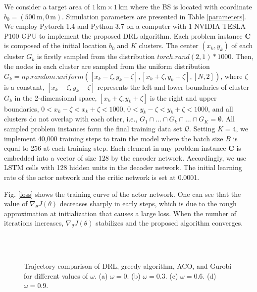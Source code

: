 \documentclass[journal]{IEEEtran}
\begin{document}
We consider a target area of $1\, \text{km} \times 1 \,\text{km}$ where the BS is located with coordinate $b_0 = (500\, \text{m}, 0 \,\text{m})$. Simulation parameters are presented in Table \ref{parameters}. We employ Pytorch 1.4 and Python 3.7 on a computer with 1 NVIDIA TESLA P100 GPU to implement the proposed DRL algorithm. {Each problem instance $\bm{C}$ is composed of the initial location $b_0$ and $K$ clusters. The center $(x_k, y_k)$ of each cluster $G_k$ is firstly sampled from the distribution $ torch.rand(2, 1) * 1000$. Then, the nodes in each cluster are sampled from the uniform distribution $G_k = np.random.uniform([x_k-\zeta, y_k-\zeta], [x_k+\zeta, y_k+\zeta], [N, 2])$, where $\zeta$ is a constant, $[x_k-\zeta, y_k-\zeta]$ represents the left and lower boundaries of cluster $G_k$ in the 2-dimensional space, $[x_k+\zeta, y_k+\zeta]$ is the right and upper boundaries, $0 < x_k-\zeta < x_k+\zeta < 1000$, $0 < y_k-\zeta < y_k+\zeta < 1000$, and all clusters do not overlap with each other, i.e., $G_1 \cap \dots \cap G_k \cap \dots \cap G_K = \emptyset$. All sampled problem instances form the final training data set $\bm{\mathcal{Q}}$.} Setting $K=4$, we implement 40,000 training steps to train the model where the batch size $B$ is equal to 256 at each training step. Each element in any problem instance $\bm{C}$ is embedded into a vector of size 128 by the encoder network. Accordingly, we use LSTM cells with 128 hidden units in the decoder network. The initial learning rate of the actor network and the critic network is set at 0.0001.

{Fig. \ref{loss} shows the training curve of the actor network. One can see that the value of $\nabla_{\theta}J\left(\theta\right)$ decreases sharply in early steps, which is due to the rough approximation at initialization that causes a large loss. When the number of iterations increases,
$\nabla_{\theta}J\left(\theta\right)$ stabilizes and the proposed algorithm converges.}



\begin{figure*}[!t]
  \centering
    \hspace{-0.2in}
	 \\

    \hspace{-0.2in}
	 \\
     \caption{{Trajectory comparison of DRL, greedy algorithm, ACO,  and Gurobi for different values of $\omega$. (a) $\omega = 0$. (b) $\omega = 0.3$. (c) $\omega = 0.6$. (d) $\omega = 0.9$.}}
	 \label{trajectory comparison}
	\vspace{0in}
\end{figure*}
\end{document}
